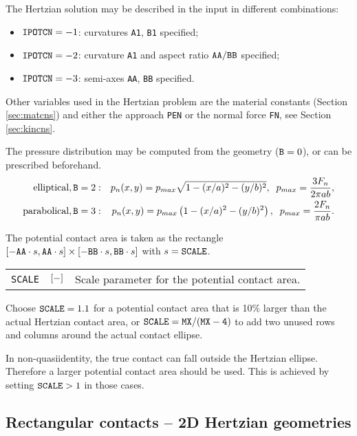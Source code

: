 \documentclass[12pt]{report}
\newenvironment{inputvars}{\vspace{0.4\baselineskip}%

\begin{tabular}{>{\raggedright}p{22mm}p{19mm}p{113mm}}}{
\end{tabular}

}
\newcommand{\inpvar}[3]{{\small\tt #1} & $#2$ & #3 \\[1ex]}
\begin{document}
The Hertzian solution may be described in the input in different combinations:
\begin{itemize}
\item ${\tt IPOTCN}=-1$: curvatures {\tt A1}, {\tt B1} specified;
\item ${\tt IPOTCN}=-2$: curvature {\tt A1} and aspect ratio
        ${\tt AA}/{\tt BB}$ specified;
\item ${\tt IPOTCN}=-3$: semi-axes {\tt AA}, {\tt BB} specified.
\end{itemize}
Other variables used in the Hertzian problem are the material constants
(Section \ref{sec:matcns}) and either the approach {\tt PEN} or the
normal force {\tt FN}, see Section \ref{sec:kincns}.

The pressure distribution may be computed from the geometry (${\tt B}=0$),
or can be prescribed beforehand.
\begin{eqnarray}
 \mbox{elliptical}, {\tt B}=2  &:& 
                p_n(x,y) = p_{max} \sqrt{ 1 - (x/a)^2 - (y/b)^2 },
        \;\; p_{max} = \frac{3F_n}{2\pi ab}, \\
 \mbox{parabolical}, {\tt B}=3 &:& 
                p_n(x,y) = p_{max} \left( 1 - (x/a)^2 - (y/b)^2 \right),
        \;\; p_{max} = \frac{2F_n}{\pi ab} .
\end{eqnarray}

The potential contact area is taken as the rectangle $[-{\tt AA}\cdot s,{\tt
AA}\cdot s] \times [-{\tt BB}\cdot s,{\tt BB}\cdot s]$ with $s={\tt
SCALE}$. 
\begin{inputvars}
\inpvar{SCALE}{\bunit{-}}{Scale parameter for the potential contact area.}
\end{inputvars}
Choose ${\tt SCALE}=1.1$ for a potential contact area that is 10\%
larger than the actual Hertzian contact area, or ${\tt SCALE}={\tt MX}/({\tt
MX-4})$ to add two unused rows and columns around the actual contact
ellipse.

In non-quasiidentity, the true contact can fall outside the Hertzian ellipse.
Therefore a larger potential contact area should be used. This is achieved by
setting ${\tt SCALE}>1$ in those cases.

\subsection{Rectangular contacts -- 2D Hertzian geometries}
\label{sec:hertz2d}
\end{document}
